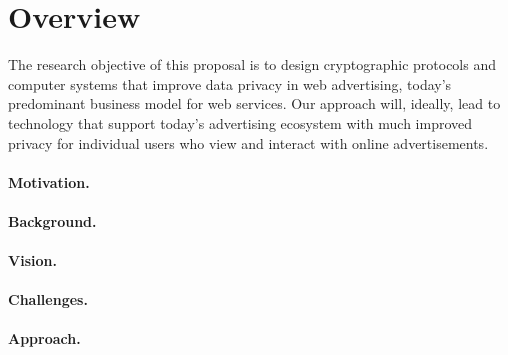 \section{Overview}
\label{s:overview}

The research objective of this proposal is to design cryptographic protocols and
computer systems that improve data privacy in web advertising, today's
predominant business model for web services.
%
Our approach will, ideally, lead to technology that support today's advertising
ecosystem with much improved privacy for individual users who view and
interact with online advertisements.
%

\paragraph{Motivation.}

\paragraph{Background.}

\paragraph{Vision.}

\paragraph{Challenges.}

\paragraph{Approach.}
